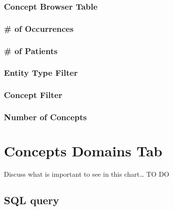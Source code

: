 \documentclass[]{book}
\begin{document}
\subsubsection{Concept Browser Table}\label{concept-browser-table}

\subsubsection{\# of Occurrences}\label{of-occurrences}

\subsubsection{\# of Patients}\label{of-patients}

\subsubsection{Entity Type Filter}\label{entity-type-filter}

\subsubsection{Concept Filter}\label{concept-filter}

\subsubsection{Number of Concepts}\label{number-of-concepts}

\section{Concepts Domains Tab}\label{concepts-domains-tab}

Discuss what is important to see in this chart\ldots{} TO DO

\subsection{SQL query}\label{sql-query-17}
\end{document}
